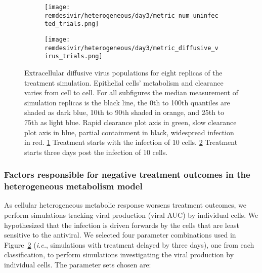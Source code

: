 \begin{figure}[H]
\centering
\begin{subfigure}{0.8\textwidth}
\texttt{[image: remdesivir/heterogeneous/day3/metric\_num\_uninfected\_trials.png]}
\caption{}\label{fig:remdes:res:treat:hetero:diff_vir:day0}
\end{subfigure}
\begin{subfigure}{0.8\textwidth}
\texttt{[image: remdesivir/heterogeneous/day3/metric\_diffusive\_virus\_trials.png]}
\caption{}\label{fig:remdes:res:treat:hetero:diff_vir:day3}
\end{subfigure}
\caption{Extracellular diffusive virus populations for eight replicas of the treatment simulation. Epithelial cells' metabolism and clearance varies from cell to cell. For all subfigures the median measurement of simulation replicas is the black line, the 0th to 100th quantiles are shaded as dark blue, 10th to 90th shaded in orange, and 25th to 75th as light blue. Rapid clearance plot axis in green, slow clearance plot axis in blue, partial containment in black, widespread infection in red.
 \ref{fig:remdes:res:treat:hetero:diff_vir:day0} Treatment starts with the infection of 10 cells. \ref{fig:remdes:res:treat:hetero:diff_vir:day3} Treatment starts three days post the infection of 10 cells.}\label{fig:remdes:res:treat:hetero:diff_vir}
\end{figure}


\subsubsection{Factors responsible for negative treatment outcomes in the heterogeneous metabolism model}\label{sec:remdes:res:superspreaders}

As cellular heterogeneous metabolic response worsens treatment outcomes, we perform simulations tracking viral production (viral AUC) by individual cells. We hypothesized that the infection is driven forwards by the cells that are least sensitive to the antiviral. We selected four parameter combinations used in Figure~\ref{fig:remdes:res:treat:hetero:diff_vir:day3} (\emph{i.e.}, simulations with  treatment delayed by three days), one from each classification, to perform simulations investigating the viral production by individual cells. The parameter sets chosen are:

